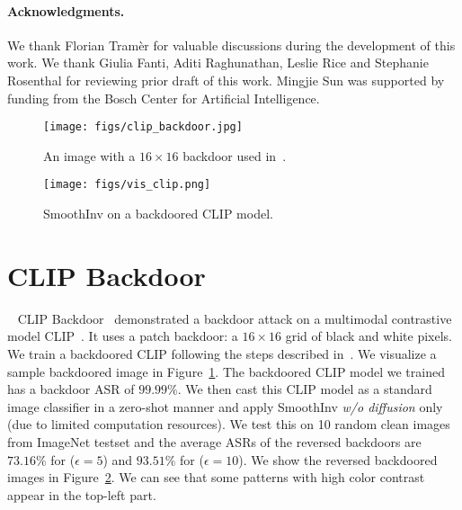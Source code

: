 \documentclass[10pt,twocolumn,letterpaper]{article}
\begin{document}
\paragraph{Acknowledgments.} We thank Florian Tram\`er for valuable discussions during the development of this work. We thank Giulia Fanti, Aditi Raghunathan, Leslie Rice and Stephanie Rosenthal
 for reviewing prior draft of this work.  Mingjie Sun was supported by funding from the Bosch Center for Artificial Intelligence. 


{\small


}

% 

\appendix

\begin{figure}[htbp]
\centering 
        \begin{minipage}[]{0.5\linewidth}
        {\texttt{[image: figs/clip\_backdoor.jpg]}}
        \end{minipage}
    \caption{An image with a $16\times16$ backdoor used in~\cite{carlini2022clip}.}
    \label{appendix:fig:clip_backdoored_example}
\end{figure}

\begin{figure}[htbp]
\centering 
        \begin{minipage}[]{0.9\linewidth}
        {\texttt{[image: figs/vis\_clip.png]}}
        \end{minipage}
    \caption{SmoothInv on a backdoored CLIP model.}
    \label{appendix:fig:clip_backdoor}
\end{figure}

\section{CLIP Backdoor~\cite{carlini2022clip}}~\label{appendix:clip_backdoor}
CLIP Backdoor~\cite{carlini2022clip} demonstrated a backdoor attack on a multimodal contrastive model CLIP~\cite{radford2021clip}. It uses a patch backdoor: a $16\times16$ grid of black and white pixels. We train a backdoored CLIP following the steps described in~\cite{carlini2022clip}. We visualize a sample backdoored image in Figure~\ref{appendix:fig:clip_backdoored_example}. The  backdoored CLIP model we trained has a backdoor ASR of $99.99\%$. We then cast this CLIP model as a standard image classifier in a zero-shot manner and apply SmoothInv \textit{w/o diffusion} only (due to limited computation resources). We test this on 10 random clean images from ImageNet testset and the average ASRs of the reversed backdoors are $73.16\%$ for ($\epsilon=5$) and $93.51\%$ for ($\epsilon=10$). We show the reversed backdoored images in Figure~\ref{appendix:fig:clip_backdoor}. We can see that some patterns with high color contrast appear in the top-left part.
\end{document}
